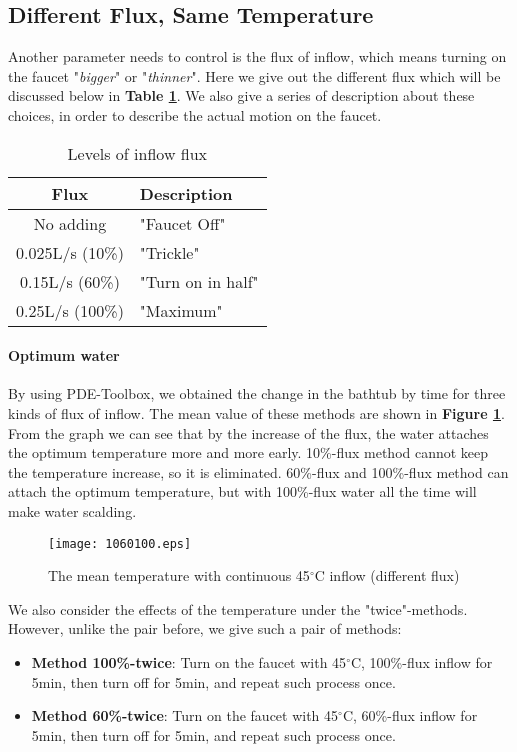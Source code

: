\documentclass[12pt]{article}
\begin{document}
\subsection{Different Flux, Same Temperature}
Another parameter needs to control is the flux of inflow, which means turning on the faucet
"\emph{bigger}" or "\emph{thinner}". Here we give out the different flux which will be discussed
below in \textbf{Table \ref{vl}}. We also give a series of description about these choices, in order
to describe the actual motion on the faucet.
\begin{table}[!htbp]
\begin{center}
\caption{Levels of inflow flux}
\begin{tabular}{cl}
    \toprule
    Flux&Description\\
    \midrule
    No adding&"Faucet Off"\\
    0.025L/s (10\%)&"Trickle"\\
    0.15L/s (60\%)&"Turn on in half"\\
    0.25L/s (100\%)&"Maximum"\\
    \bottomrule
\end{tabular}\label{vl}
\end{center}
\end{table}
\paragraph{Optimum water}
By using PDE-Toolbox, we obtained the change in the bathtub by time for three kinds of flux of
inflow. The mean value of these methods are shown in \textbf{Figure \ref{ll}}. From the graph we can
see that by the increase of the flux, the water attaches the optimum temperature more and more
early. 10\%-flux method cannot keep the temperature increase, so it is eliminated. 60\%-flux and
100\%-flux method can attach the optimum temperature, but with 100\%-flux water all the time will
make water scalding.
\begin{figure}[ht]
\small
\centering
\texttt{[image: 1060100.eps]}
\caption{The mean temperature with continuous 45$^\circ$C inflow (different flux)}\label{ll}
\end{figure}

We also consider the effects of the temperature under the "twice"-methods. However, unlike the pair
before, we give such a pair of methods:
\begin{itemize}
    \item \textbf{Method 100\%-twice}: Turn on the faucet with 45$^\circ$C, 100\%-flux inflow for
    5min, then turn off for 5min, and repeat such process once.
    \item \textbf{Method 60\%-twice}: Turn on the faucet with 45$^\circ$C, 60\%-flux inflow for
    5min, then turn off for 5min, and repeat such process once.
\end{itemize}
\end{document}
